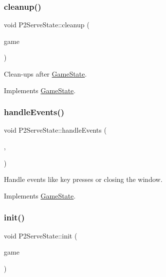 \subsubsection{\texorpdfstring{cleanup()}{cleanup()}}
{\footnotesize\ttfamily void P2\+Serve\+State\+::cleanup (\begin{DoxyParamCaption}\item[{\mbox{\hyperlink{class_game_engine}{Game\+Engine}} $\ast$}]{game }\end{DoxyParamCaption})\hspace{0.3cm}{\ttfamily [virtual]}}



Clean-\/ups after \mbox{\hyperlink{class_game_state}{Game\+State}}. 



Implements \mbox{\hyperlink{class_game_state_a7df4ea0b4815d2b3b35dbec2a399a0b6}{Game\+State}}.

\mbox{\label{class_p2_serve_state_af7634dd3bdfca0279b5c9abc6632b2e4}} 
\subsubsection{\texorpdfstring{handleEvents()}{handleEvents()}}
{\footnotesize\ttfamily void P2\+Serve\+State\+::handle\+Events (\begin{DoxyParamCaption}\item[{\mbox{\hyperlink{class_game_engine}{Game\+Engine}} $\ast$}]{,  }\item[{sf\+::\+Event}]{ }\end{DoxyParamCaption})\hspace{0.3cm}{\ttfamily [virtual]}}



Handle events like key presses or closing the window. 



Implements \mbox{\hyperlink{class_game_state_a3ef0638514dbfe71581d593cf0f66ce5}{Game\+State}}.

\mbox{\label{class_p2_serve_state_a7f6cbb73e0d08949e3df08b97ba089f5}} 
\subsubsection{\texorpdfstring{init()}{init()}}
{\footnotesize\ttfamily void P2\+Serve\+State\+::init (\begin{DoxyParamCaption}\item[{\mbox{\hyperlink{class_game_engine}{Game\+Engine}} $\ast$}]{game }\end{DoxyParamCaption})\hspace{0.3cm}{\ttfamily [virtual]}}



